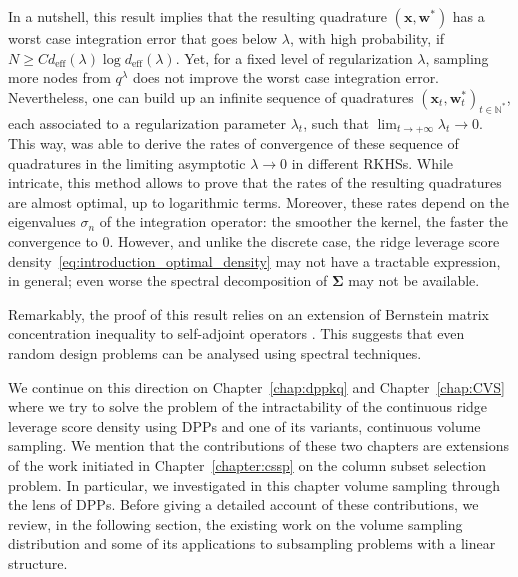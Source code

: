 \documentclass[twoside,11pt]{book}
\numberwithin{theorem}{chapter}
\numberwithin{definition}{chapter}
\numberwithin{proposition}{chapter}
\numberwithin{corollary}{chapter}
\numberwithin{example}{chapter}
\numberwithin{lemma}{chapter}
\numberwithin{assumption}{chapter}
\numberwithin{equation}{chapter}
\numberwithin{figure}{chapter}
\DeclareMathOperator{\eff}{\mathrm{eff}}
\begin{document}
In a nutshell, this result implies that the resulting quadrature $(\bm{x}, \bm{w}^{*})$ has a worst case integration error that goes below $\lambda$, with high probability, if $N \geq C d_{\eff}(\lambda) \log d_{\eff}(\lambda)$. Yet, for a fixed level of regularization $\lambda$, sampling more nodes from $q^{\lambda}$ does not improve the worst case integration error. 
Nevertheless, one can build up an infinite sequence of quadratures $(\bm{x}_{t}, \bm{w}^{*}_{t})_{t \in \mathbb{N}^{*}}$, each associated to a regularization parameter $\lambda_{t}$, such that $\lim_{t \rightarrow +\infty}\lambda_{t} \rightarrow 0$. This way, \cite{Bac17} was able to derive the rates of convergence of these sequence of quadratures in the limiting asymptotic $\lambda \rightarrow 0$ in different RKHSs. While intricate, this method allows to prove that the rates of the resulting quadratures are almost optimal, up to logarithmic terms. Moreover, these rates depend on the eigenvalues $\sigma_{n}$ of the integration operator: the smoother the kernel, the faster the convergence to $0$. 
However, and unlike the discrete case, the ridge leverage score density~\ref{eq:introduction_optimal_density} may not have a tractable expression, in general; even worse the spectral decomposition of $\bm{\Sigma}$ may not be available.


Remarkably, the proof of this result relies on an extension of Bernstein matrix concentration inequality to self-adjoint operators \parencite{Min17}. This suggests that even random design problems can be analysed using spectral techniques. 

We continue on this direction on Chapter~\ref{chap:dppkq} and Chapter~\ref{chap:CVS} where we try to solve the problem of the intractability of the continuous ridge leverage score density using DPPs and one of its variants, continuous volume sampling. We mention that the contributions of these two chapters are extensions of the work initiated in Chapter~\ref{chapter:cssp} on the column subset selection problem. In particular, we investigated in this chapter volume sampling through the lens of DPPs. Before giving a detailed account of these contributions, we review, in the following section, the existing work on the volume sampling distribution and some of its applications to subsampling problems with a linear structure.
\end{document}
